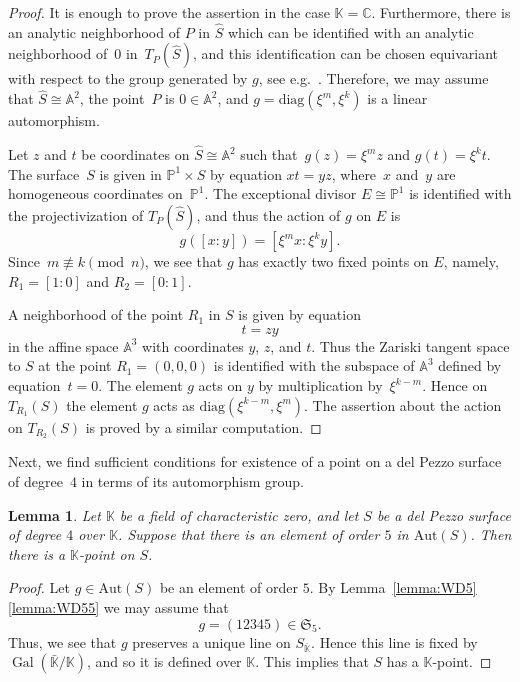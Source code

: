 \documentclass[12pt]{amsart}
\newcounter{cequation}[section]
\newtheorem{lemma}[cequation]{Lemma}
\theoremstyle{definition}
\theoremstyle{remark}
\newcommand{\CC}{\mathbb{C}}
\newcommand{\PP}{\mathbb{P}}
\newcommand{\KK}{\mathbb{K}}
\newcommand{\Gal}{\operatorname{Gal}}
\begin{document}
\begin{proof}
It is enough to prove the assertion in the case $\KK=\CC$.
Furthermore, there is an analytic neighborhood of $P$ in $\hat{S}$
which can be identified with an analytic neighborhood of~$0$ in~$T_P(\hat{S})$,
and this identification can be chosen equivariant with respect to the group
generated by $g$, see e.g.~\mbox{\cite[\S2.2]{Akhiezer}}.
Therefore, we may assume that
$\hat{S}\cong\mathbb{A}^2$, the point~$P$ is $0\in\mathbb{A}^2$,
and $g=\mathrm{diag}(\xi^m, \xi^k)$ is a linear automorphism.

Let $z$ and $t$ be coordinates on $\hat{S}\cong\mathbb{A}^2$
such that~\mbox{$g(z)=\xi^m z$} and $g(t)=\xi^k t$.
The surface~$S$ is given in $\PP^1 \times \hat{S}$ by
equation  $xt=yz$, where~$x$ and~$y$ are homogeneous coordinates
on~$\PP^1$. The exceptional divisor $E\cong\PP^1$ is identified
with the projectivization of $T_{P}(\hat{S})$,
and thus the action of $g$ on $E$ is
$$
g([x:y])=[\xi^m x: \xi^k y].
$$
Since~\mbox{$m\not\equiv k\pmod n$}, we see that
$g$ has exactly two fixed points on $E$, namely, \mbox{$R_1=[1:0]$}
and $R_2=[0:1]$.

A neighborhood of the point $R_1$ in $S$ is given by equation
\begin{equation*}%
t=zy
\end{equation*}
in the affine space $\mathbb{A}^3$ with coordinates $y$, $z$, and $t$.
Thus the Zariski tangent space to $S$ at the point $R_1=(0,0,0)$
is identified with the subspace of $\mathbb{A}^3$
defined by equation~\mbox{$t=0$}.
The element $g$ acts on $y$ by multiplication
by~$\xi^{k-m}$. Hence on $T_{R_1}(S)$ the element $g$ acts
as $\mathrm{diag}(\xi^{k-m}, \xi^{m})$.
The assertion about the action on $T_{R_2}(S)$
is proved by a similar computation. 
\end{proof}



Next, we find sufficient conditions for existence of a point on a del Pezzo surface of degree~$4$
in terms of its automorphism group.

\begin{lemma}\label{lemma:dp4order5}
Let $\KK$ be a field of characteristic zero, and let $S$ be a del Pezzo surface of degree $4$ over $\KK$. Suppose that there is an element of order $5$ in $\mathrm{Aut}(S)$. Then there is a $\KK$-point on $S$.
\end{lemma}

\begin{proof}
Let $g \in \mathrm{Aut}(S)$ be an element of order $5$.
By Lemma~\ref{lemma:WD5}\ref{lemma:WD55} we may assume that
$$
g=(12345)\in\mathfrak{S}_5.
$$
Thus, we see that $g$ preserves a unique line on $S_{\bar{\KK}}$. Hence this line is fixed by $\Gal(\bar{\KK}/\KK)$, and
so it is defined over $\KK$. This implies that $S$ has a $\KK$-point.
\end{proof}
\end{document}
